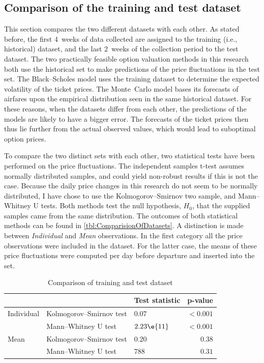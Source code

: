 \subsection{Comparison of the training and test dataset}
This section compares the two different datasets with each other. As stated before, the first 4~weeks of data collected are assigned to the training (i.e., historical) dataset, and the last 2~weeks of the collection period to the test dataset. The two practically feasible option valuation methods in this research both use the historical set to make predictions of the price fluctuations in the test set. The Black--Scholes model uses the training dataset to determine the expected volatility of the ticket prices. The Monte~Carlo model bases its forecasts of airfares upon the empirical distribution seen in the same historical dataset. For these reasons, when the datasets differ from each other, the predictions of the models are likely to have a bigger error. The forecasts of the ticket prices then thus lie further from the actual observed values, which would lead to suboptimal option prices.

To compare the two distinct sets with each other, two statistical tests have been performed on the price fluctuations. The independent samples t-test assumes normally distributed samples, and could yield non-robust results if this is not the case. Because the daily price changes in this research do not seem to be normally distributed, I have chose to use the Kolmogorov--Smirnov two sample, and Mann--Whitney U tests. Both methods test the null hypothesis, $H_0$, that the supplied samples came from the same distribution.  The outcomes of both statistical methods can be found in \autoref{tbl:ComparisionOfDatasets}. A distinction is made between \emph{Individual} and \emph{Mean} observations. In the first category all the price observations were included in the dataset. For the latter case, the means of these price fluctuations were computed per day before departure and inserted into the set.


\begin{table}
\centering
\begin{tabular}{l l l r}
\toprule
~  &  ~  &  Test statistic  &  p-value  \\
\midrule
Individual  &   Kolmogorov--Smirnov test  & $0.07$  &  $< 0.001$  \\
~           &   Mann--Whitney U test  &  $2.23 \e{11}$ &  $< 0.001$ \\
Mean        &   Kolmogorov--Smirnov test  & $0.20$  &  $0.38$  \\
~           &   Mann--Whitney U test  &  $788$  &  $0.31$ \\
\bottomrule
\end{tabular}
\caption{Comparison of training and test dataset}
\label{tbl:ComparisionOfDatasets}
\end{table}


